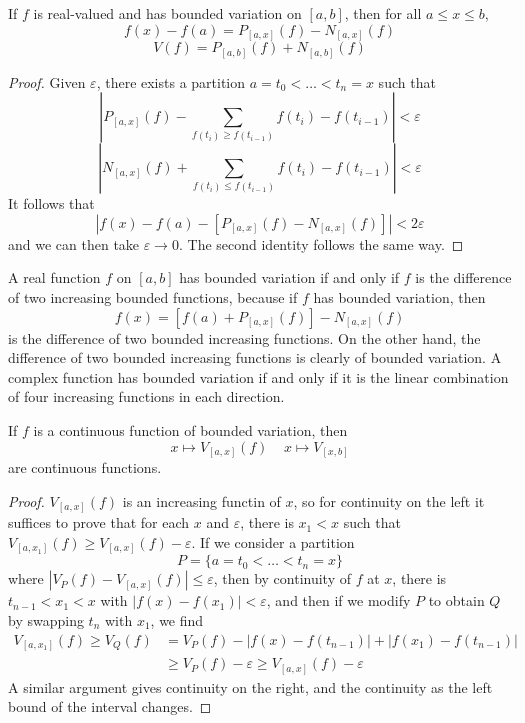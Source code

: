 \begin{lemma}
    If $f$ is real-valued and has bounded variation on $[a,b]$, then for all $a \leq x \leq b$,
    \[ f(x) - f(a) = P_{[a,x]}(f) - N_{[a,x]}(f) \]
    \[ V(f) = P_{[a,b]}(f) + N_{[a,b]}(f) \]
\end{lemma}
\begin{proof}
    Given $\varepsilon$, there exists a partition $a = t_0 < \dots < t_n = x$ such that
    \[ \left| P_{[a,x]}(f) - \sum_{f(t_i) \geq f(t_{i-1})} f(t_i) - f(t_{i-1}) \right| < \varepsilon \]
    \[ \left| N_{[a,x]}(f) + \sum_{f(t_i) \leq f(t_{i-1})} f(t_i) - f(t_{i-1}) \right| < \varepsilon \]
    It follows that
    \[ |f(x) - f(a) - [P_{[a,x]}(f) - N_{[a,x]}(f)]| < 2 \varepsilon \]
    and we can then take $\varepsilon \to 0$. The second identity follows the same way.
\end{proof}

A real function $f$ on $[a,b]$ has bounded variation if and only if $f$ is the difference of two increasing bounded functions, because if $f$ has bounded variation, then
%
\[ f(x) = [f(a) + P_{[a,x]}(f)] - N_{[a,x]}(f) \]
%
is the difference of two bounded increasing functions. On the other hand, the difference of two bounded increasing functions is clearly of bounded variation. A complex function has bounded variation if and only if it is the linear combination of four increasing functions in each direction.

\begin{theorem}
    If $f$ is a continuous function of bounded variation, then
    \[ x \mapsto V_{[a,x]}(f) \ \ \ \ \ x \mapsto V_{[x,b]} \]
    are continuous functions.
\end{theorem}
\begin{proof}
    $V_{[a,x]}(f)$ is an increasing functin of $x$, so for continuity on the left it suffices to prove that for each $x$ and $\varepsilon$, there is $x_1 < x$ such that $V_{[a,x_1]}(f) \geq V_{[a,x]}(f) - \varepsilon$. If we consider a partition
    \[ P = \{ a = t_0 <  \dots < t_n = x \} \]
    where $|V_P(f) - V_{[a,x]}(f)| \leq \varepsilon$, then by continuity of $f$ at $x$, there is $t_{n-1} < x_1 < x$ with $|f(x) - f(x_1)| < \varepsilon$, and then if we modify $P$ to obtain $Q$ by swapping $t_n$ with $x_1$, we find
    \begin{align*}
        V_{[a,x_1]}(f) \geq V_Q(f) &= V_P(f) - |f(x) - f(t_{n-1})| + |f(x_1) - f(t_{n-1})|\\
        &\geq V_P(f) - \varepsilon \geq V_{[a,x]}(f) - \varepsilon
    \end{align*}
    A similar argument gives continuity on the right, and the continuity as the left bound of the interval changes.
\end{proof}

